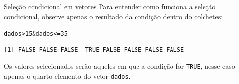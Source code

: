 \documentclass[10pt,handout]{beamer}\usepackage[]{graphicx}\usepackage[]{color}
\makeatletter
\newcommand{\hlnum}[1]{\textcolor[rgb]{0.686,0.059,0.569}{#1}}%
\newcommand{\hlopt}[1]{\textcolor[rgb]{0,0,0}{#1}}%
\newcommand{\hlstd}[1]{\textcolor[rgb]{0.345,0.345,0.345}{#1}}%
\newenvironment{kframe}{%
 \def\at@end@of@kframe{}%
 \ifinner\ifhmode%
  \def\at@end@of@kframe{\end{minipage}}%
  \begin{minipage}{\columnwidth}%
 \fi\fi%
 \def\FrameCommand##1{\hskip\@totalleftmargin \hskip-\fboxsep
 \colorbox{shadecolor}{##1}\hskip-\fboxsep
     \hskip-\linewidth \hskip-\@totalleftmargin \hskip\columnwidth}%
 \MakeFramed {\advance\hsize-\width
   \@totalleftmargin\z@ \linewidth\hsize
   \@setminipage}}%
 {\par\unskip\endMakeFramed%
 \at@end@of@kframe}
\newenvironment{knitrout}{}{} %
\makeatother
\begin{document}
\begin{frame}[fragile]{Seleção condicional em vetores}
Para entender como funciona a seleção condicional, observe apenas o
resultado da condição dentro do colchetes:
\begin{knitrout}\small
{}\color{fgcolor}\begin{kframe}
\begin{alltt}
\hlstd{dados} \hlopt{>} \hlnum{15} \hlopt{&} \hlstd{dados} \hlopt{<=} \hlnum{35}
\end{alltt}
\begin{verbatim}
[1] FALSE FALSE FALSE  TRUE FALSE FALSE FALSE FALSE
\end{verbatim}
\end{kframe}
\end{knitrout}
Os valores selecionados serão aqueles em que a condição for
\texttt{TRUE}, nesse caso apenas o quarto elemento do vetor
\texttt{dados}.
\end{frame}
\end{document}
